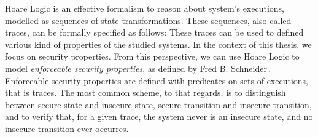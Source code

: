 Hoare Logic is an effective formalism to reason about system's executions,
modelled as sequences of state-transformations.
%
These sequences, also called traces, can be formally specified as follows:
%
%
%
These traces can be used to defined various kind of properties of the studied
systems.
%
In the context of this thesis, we focus on security properties.
%
From this perspective, we can use Hoare Logic to model \emph{enforceable
  security properties}, as defined by Fred
B. Schneider\,\cite{schneider2000enforceable}.
%
Enforceable security properties are defined with predicates on sets of
executions, that is traces.
%
The most common scheme, to that regards, is to distinguish between secure state
and insecure state, secure transition and insecure transition, and to verify
that, for a given trace, the system never is an insecure state, and no insecure
transition ever occurres.

